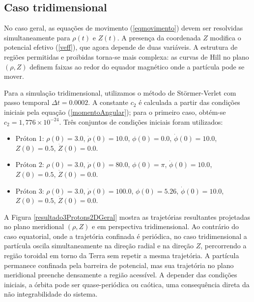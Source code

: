 \documentclass[twocolumn]{rbef}
\begin{document}
\subsection{Caso tridimensional}

No caso geral, as equações de movimento (\ref{eqmovimento}) devem ser resolvidas simultaneamente para $\rho(t)$ e $Z(t)$. A presença da coordenada $Z$ modifica o potencial efetivo (\ref{veff}), que agora depende de duas variáveis. A estrutura de regiões permitidas e proibidas torna-se mais complexa: as curvas de Hill no plano $(\rho, Z)$ definem faixas ao redor do equador magnético onde a partícula pode se mover.

Para a simulação tridimensional, utilizamos o método de Störmer-Verlet com passo temporal $\Delta t = 0.0002$. A constante $c_2$ é calculada a partir das condições iniciais pela equação (\ref{momentoAngular}); para o primeiro caso, obtém-se $c_2 = 1{,}776 \times 10^{-24}$. Três conjuntos de condições iniciais foram utilizados:

\begin{itemize}
    \item Próton 1: $\rho(0) = 3.0$, $\dot{\rho}(0) = 10.0$, $\phi(0) = 0.0$, $\dot{\phi}(0) = 10.0$, $Z(0) = 0.5$, $\dot{Z}(0) = 0.0$.
    \item Próton 2: $\rho(0) = 3.0$, $\dot{\rho}(0) = 80.0$, $\phi(0) = \pi$, $\dot{\phi}(0) = 10.0$, $Z(0) = 0.5$, $\dot{Z}(0) = 0.0$.
    \item Próton 3: $\rho(0) = 3.0$, $\dot{\rho}(0) = 100.0$, $\phi(0) = 5.26$, $\dot{\phi}(0) = 10.0$, $Z(0) = 0.5$, $\dot{Z}(0) = 0.0$.
\end{itemize}

A Figura \ref{resultado3Protons2DGeral} mostra as trajetórias resultantes projetadas no plano meridional $(\rho, Z)$ e em perspectiva tridimensional. Ao contrário do caso equatorial, onde a trajetória confinada é periódica, no caso tridimensional a partícula oscila simultaneamente na direção radial e na direção $Z$, percorrendo a região toroidal em torno da Terra sem repetir a mesma trajetória. A partícula permanece confinada pela barreira de potencial, mas sua trajetória no plano meridional preenche densamente a região acessível. A depender das condições iniciais, a órbita pode ser quase-periódica ou caótica, uma consequência direta da não integrabilidade do sistema.
\end{document}
